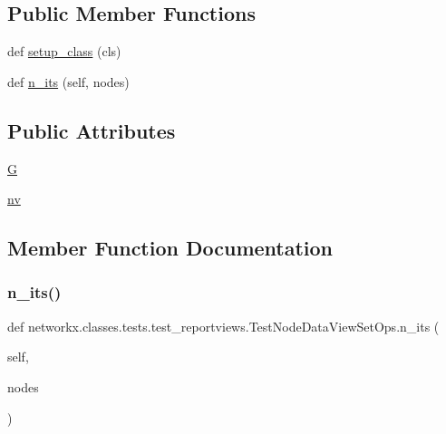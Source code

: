 \subsection*{Public Member Functions}
\begin{DoxyCompactItemize}
\item 
def \hyperlink{classnetworkx_1_1classes_1_1tests_1_1test__reportviews_1_1TestNodeDataViewSetOps_ac10cac6718cb5abc5e6b3b89bac5c108}{setup\+\_\+class} (cls)
\item 
def \hyperlink{classnetworkx_1_1classes_1_1tests_1_1test__reportviews_1_1TestNodeDataViewSetOps_a06e09145cb66cd7dc16fc62e2b6f615c}{n\+\_\+its} (self, nodes)
\end{DoxyCompactItemize}
\subsection*{Public Attributes}
\begin{DoxyCompactItemize}
\item 
\hyperlink{classnetworkx_1_1classes_1_1tests_1_1test__reportviews_1_1TestNodeDataViewSetOps_ae3e6180183553a35af486a48c1d36ea0}{G}
\item 
\hyperlink{classnetworkx_1_1classes_1_1tests_1_1test__reportviews_1_1TestNodeDataViewSetOps_abe6f433588339d6cd5f540e7527a2449}{nv}
\end{DoxyCompactItemize}


\subsection{Member Function Documentation}
\mbox{\label{classnetworkx_1_1classes_1_1tests_1_1test__reportviews_1_1TestNodeDataViewSetOps_a06e09145cb66cd7dc16fc62e2b6f615c}} 
\subsubsection{\texorpdfstring{n\+\_\+its()}{n\_its()}}
{\footnotesize\ttfamily def networkx.\+classes.\+tests.\+test\+\_\+reportviews.\+Test\+Node\+Data\+View\+Set\+Ops.\+n\+\_\+its (\begin{DoxyParamCaption}\item[{}]{self,  }\item[{}]{nodes }\end{DoxyParamCaption})}

